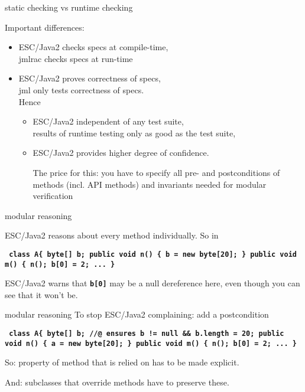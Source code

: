 \documentclass[
pdf,
nocolorBG,
slideColor,
erik,
]{prosper}
\newcommand{\code}[1]{{\rm \texttt{\textbf{\small #1}}}}
\begin{document}
\begin{slide}{static checking vs runtime checking}
\vspace*{-4ex}

Important differences:

\begin{itemize}
\item ESC/Java2 checks specs at {\blue compile-time}, \\
      jmlrac checks specs at {\green run-time}

\item ESC/Java2 {\blue proves} correctness of specs,\\
      jml only {\green tests} correctness of specs.
\\
Hence
\begin{itemize}
\item ESC/Java2 independent of any test suite, \\
      results of runtime testing only as good as the test suite,
\item ESC/Java2 provides higher degree of confidence.

\medskip
The price for this: you have to specify all pre- and postconditions
of methods (incl. API methods)
and invariants needed for {\blue modular verification}
\end{itemize}


\end{itemize}

\end{slide}


\begin{slide}{modular reasoning}
\vspace*{-4ex}

ESC/Java2 reasons about every method individually.
So in

\begin{alltt}\code{ class A\{
  byte[] b;
  public void n() \{ b = new byte[20]; \}
  public void m() \{ n();
                    b[0] = 2;
                    ...       \}
}
\end{alltt} %

ESC/Java2 warns that \code{b[0]} may be a null dereference here,
even though you can see that it won't be.
\end{slide}

\begin{slide}{modular reasoning}
\vspace*{-4ex}
To stop ESC/Java2 complaining: add a postcondition
\begin{alltt}\code{ class A\{
  byte[] b;
 {\green //@ ensures b != null && b.length = 20;}
  public void n() \{ a = new byte[20]; \}
  public void m() \{ n();
                    b[0] = 2;
                    ...       \} 
}
\end{alltt} %
So: property of method that is relied on has to be made explicit.

And: subclasses that override methods have to preserve these.

\end{slide}
\end{document}
